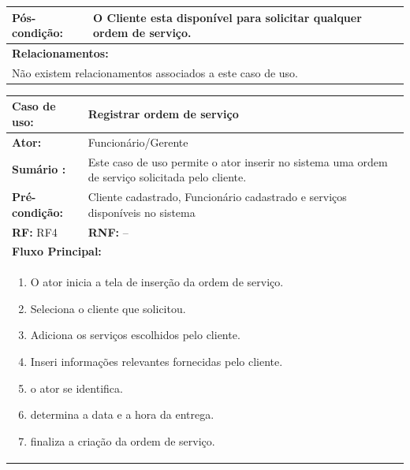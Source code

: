 \documentclass[
	12pt,				%
	openright,
	oneside,			%
	a4paper,			%
	chapter=TITLE,		%
	brazil				%
	]{abntex2}
\begin{document}
\begin{table}[h]
\begin{tabular}{|p{3cm}|p{3cm}|p{3cm}|p{3cm}|}
\textbf{Pós-condição: }  & \multicolumn{3}{p{9cm}|}{O Cliente esta disponível para solicitar qualquer ordem de serviço.}		\\ \hline
\multicolumn{4}{|p{12cm}|}{\textbf{Relacionamentos:}}                                        								\\ \hline
\multicolumn{4}{|p{12cm}|}{Não existem relacionamentos associados a este caso de uso.}                                  \\ \hline
\end{tabular}
\end{table}


\begin{table}[h]
\centering
\begin{tabular}{|p{3cm}|p{3cm}|p{3cm}|p{3cm}|}
\hline
\textbf{Caso de uso:}             & \multicolumn{3}{p{9cm}|}{Registrar ordem de serviço}               						 \\ \hline
\textbf{Ator:}                 & \multicolumn{3}{p{9cm}|}{Funcionário/Gerente}                   						 \\ \hline
\textbf{Sumário :}                & \multicolumn{3}{p{9cm}|}{Este caso de uso permite o ator inserir no sistema uma %
													 ordem de serviço solicitada pelo cliente.}    	     				\\ \hline
\textbf{Pré-condição:}            & \multicolumn{3}{p{9cm}|}{ Cliente cadastrado, Funcionário cadastrado e serviços disponíveis no sistema }                 				    \\ \hline
\multicolumn{2}{|p{6cm}|}{\textbf{RF:} RF4 }                  & \multicolumn{2}{p{6cm}|}{\textbf{RNF:} -- }     	    \\ \hline
\multicolumn{4}{|p{12cm}|}{\textbf{Fluxo Principal:}}                                                					\\ \hline
\multicolumn{4}{|p{12cm}|}{%
\begin{enumerate}
  \item O ator inicia a tela de inserção da ordem de serviço.
  \item Seleciona o cliente que solicitou.
  \item Adiciona os serviços escolhidos pelo cliente.
  \item Inseri informações relevantes fornecidas pelo cliente.
  \item o ator se identifica.
  \item determina a data e a hora da entrega.
  \item finaliza a criação da ordem de serviço.

\end{enumerate}}
\end{tabular}
\end{table}
\end{document}
